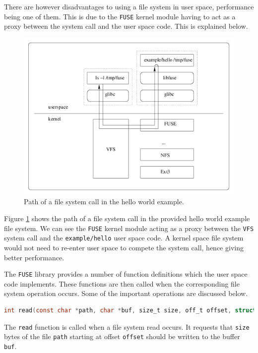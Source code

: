 \documentclass[paper=a4, fontsize=11pt,twoside]{scrartcl}    %
\numberwithin{table}{section}
\numberwithin{figure}{section}
\numberwithin{algorithm}{section}
\begin{document}
There are however disadvantages to using a file system in user space, performance being one of them. This is due to the \texttt{FUSE} kernel module having to act as a proxy between the system call and the user space code. This is explained below.

\begin{figure}[here]
\centerline{\includegraphics[width=\textwidth]{images/fuse_structure.png}}
\caption{Path of a file system call in the hello world example.}
\label{fig:fuse}
\end{figure}

Figure \ref{fig:fuse} shows the path of a file system call in the provided hello world example file system. We can see the \texttt{FUSE} kernel module acting as a proxy between the \texttt{VFS} system call and the \texttt{example/hello} user space code. A kernel space file system would not need to re-enter user space to compete the system call, hence giving better performance. 

The \texttt{FUSE} library provides a number of function definitions which the user space code implements. These functions are then called when the corresponding file system operation occurs. Some of the important operations are discussed below.

\begin{lstlisting}[language=C, caption={\texttt{FUSE} read operation.}, frame=single]
int read(const char *path, char *buf, size_t size, off_t offset, struct fuse_file_info *fi);
\end{lstlisting}

\noindent
The \texttt{read} function is called when a file system read occurs. It requests that \texttt{size} bytes of the file \texttt{path} starting at offset \texttt{offset} should be written to the buffer \texttt{buf}.
\end{document}
